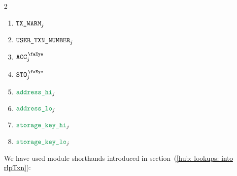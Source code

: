 \begin{description}
\begin{multicols}{2}
\begin{enumerate}
				\item $\texttt{TX}\texttt{\_WARM}                _{j}$
				\item $\texttt{USER}\texttt{\_}\texttt{TXN\_NUMBER} _{j}$
				\item $\peekAccount           _{j}$
				\item $\peekStorage           _{j}$
				\item $\locAddressHi          _{j}$
				\item $\locAddressLo          _{j}$
				\item $\locStorageKeyHi       _{j}$
				\item $\locStorageKeyLo       _{j}$
			\end{enumerate}
		\end{multicols}
\end{description}
\saNote{}
We have used \hubMod{} module shorthands introduced
in section~(\ref{hub: lookups: into rlpTxn}):

